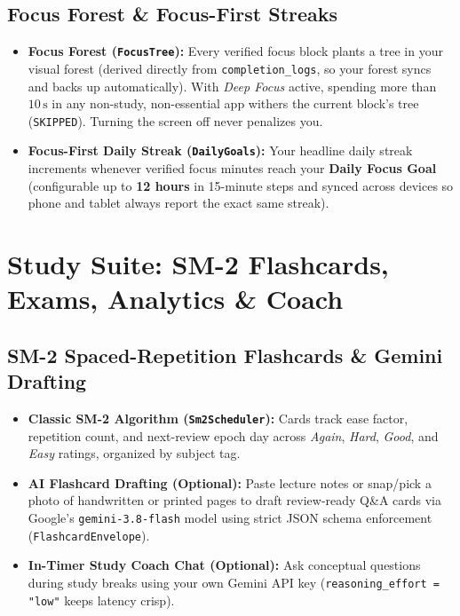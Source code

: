 \documentclass[11pt,a4paper]{article}
\begin{document}
\subsection{Focus Forest \& Focus-First Streaks}
\begin{itemize}
  \item \textbf{Focus Forest (\texttt{FocusTree}):} Every verified focus block plants a tree in your visual forest (derived directly from \texttt{completion\_logs}, so your forest syncs and backs up automatically). With \emph{Deep Focus} active, spending more than $10\,\text{s}$ in any non-study, non-essential app withers the current block's tree (\texttt{SKIPPED}). Turning the screen off never penalizes you.
  \item \textbf{Focus-First Daily Streak (\texttt{DailyGoals}):} Your headline daily streak increments whenever verified focus minutes reach your \textbf{Daily Focus Goal} (configurable up to \textbf{12 hours} in 15-minute steps and synced across devices so phone and tablet always report the exact same streak).
\end{itemize}

\section{Study Suite: SM-2 Flashcards, Exams, Analytics \& Coach}

\subsection{SM-2 Spaced-Repetition Flashcards \& Gemini Drafting}
\begin{itemize}
  \item \textbf{Classic SM-2 Algorithm (\texttt{Sm2Scheduler}):} Cards track ease factor, repetition count, and next-review epoch day across \emph{Again}, \emph{Hard}, \emph{Good}, and \emph{Easy} ratings, organized by subject tag.
  \item \textbf{AI Flashcard Drafting (Optional):} Paste lecture notes or snap/pick a photo of handwritten or printed pages to draft review-ready Q\&A cards via Google's \texttt{gemini-3.8-flash} model using strict JSON schema enforcement (\texttt{FlashcardEnvelope}).
  \item \textbf{In-Timer Study Coach Chat (Optional):} Ask conceptual questions during study breaks using your own Gemini API key (\texttt{reasoning\_effort = "low"} keeps latency crisp).
\end{itemize}
\end{document}
